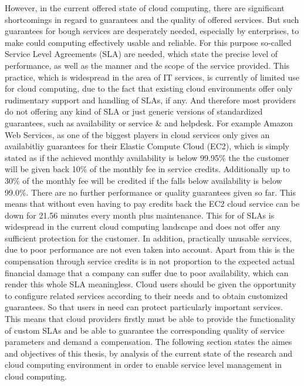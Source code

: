 However, in the current offered state of cloud computing, there are significant shortcomings in regard to guarantees and the quality of offered services. But such guarantees for bough services are desperately needed, especially by enterprises, to make could computing  effectively usable\cite{DMTF2010} and reliable\cite{JTC}. 
For this purpose so-called Service Level Agreements (SLA) are needed, which state the precise level of performance, as well as the manner and the scope of the service provided. This practice, which is widespread in the area of IT services, is currently of limited use for cloud computing, due to the fact that existing cloud environments offer only rudimentary support and handling of SLAs, if any. And therefore most providers do not offering any kind of SLA or just generic versions of standardized guarantees, such as availability or service \& and helpdesk. For example Amazon Web Services\cite{AWS}, as one of the biggest players in cloud services only gives an availabitliy guarantees for their Elastic Compute Cloud (EC2)\cite{EC2SLA}, which is simply stated as if the achieved monthly availability is below 99.95\% the the customer will be given back 10\% of the monthly fee in service credits. Additionally up to 30\% of the monthly fee will be credited if the falls below availability is below 99.0\%. There are no further performance or quality guarantees given so far. This means that without even having to pay credits back the EC2 cloud service can be down for 21.56 minutes every month plus maintenance. This for of SLAs  is widespread in the current cloud computing landscape\cite{CloudSLAwhite} \cite{Baset:2012:CSP:2331576.2331586} and does not offer any sufficient protection for the customer. In addition, practically unusable services, due to poor performance are not even taken into account. Apart from this is the compensation through service credits is in not proportion to the expected actual financial damage that a company can suffer due to poor availability, which can render this whole SLA meaningless\cite{meaning}. Cloud users should be given the opportunity to configure related services according to their needs and to obtain customized guarantees. So that users in need can protect particularly important services. This means that cloud providers firstly must be able to provide the functionality of custom SLAs and be able to guarantee the corresponding quality of service parameters and demand a compensation. The following section states the aimes and objectives of this thesis, by analysis of the current state of the research and cloud computing environment in order to enable service level management  in cloud computing.


